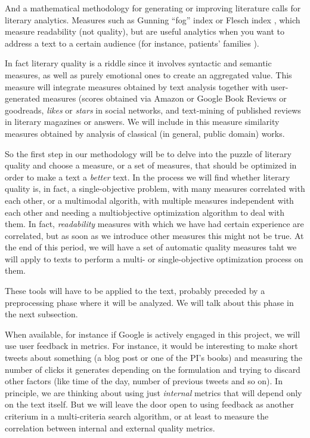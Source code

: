\documentclass[a4paper,12pt,twocolumn]{article}
\begin{document}
And a mathematical methodology for generating or improving literature
calls for literary analytics. Measures such as Gunning ``fog'' index
\cite{gunning1969fog} or Flesch index \cite{roberts1994effects}, which
measure readability (not quality), but are useful analytics when you
want to address a text to a certain audience (for instance, patients'
families \cite{grossman1994informed}). 

In fact literary quality is a riddle since it involves syntactic and
semantic measures, as well as purely emotional ones to create an aggregated value. This
  measure will integrate measures obtained by text analysis together
  with user-generated measures (scores obtained via Amazon or Google
  Book Reviews or goodreads, {\em likes} or {\em stars} in social
  networks, and text-mining of published reviews in literary magazines
  or answers. We will include in this measure similarity measures
  obtained by analysis of classical (in general, public domain)
  works. 

So the first step in our methodology will be to delve into the puzzle
of literary quality and choose a measure, or a set of measures, that
should be optimized in order to make a text a {\em better} text. In
the process we will find whether literary quality is, in fact, a
single-objective problem, with many measures correlated with each
other, or a multimodal algorith, with multiple measures independent
with each other and needing a multiobjective optimization algorithm to
deal with them. In fact, {\em readability} measures with which we have
had certain experience are correlated, but as soon as we introduce
other measures this might not be true. At the end of this period, we
will have a set of automatic quality measures taht we will apply to
texts to perform a multi- or single-objective optimization process on
them. 

These tools will have to be applied to the text, probably preceded by
a preprocessing phase where it will be analyzed. We will talk about
this phase in the next subsection.

When available, for instance if Google is actively engaged in this
project, we will use user feedback in metrics. For instance, it would
be interesting to make short tweets about something (a blog post or
one of the PI's books) and measuring the number of clicks it generates
depending on the formulation and trying to discard other factors (like
time of the day, number of previous tweets and so on). In principle,
we are thinking about using just {\em internal} metrics that will
depend only on the text itself. But we will leave the door open to
using feedback as another criterium in a multi-criteria search
algorithm, or at least to measure the correlation between internal and
external quality metrics. 
\end{document}
